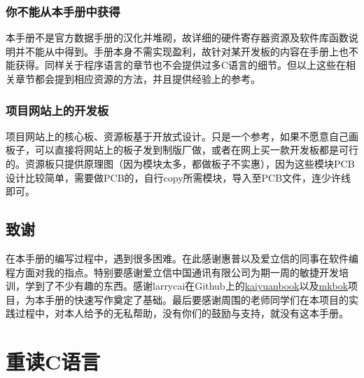 \documentclass[a4paper]{book}
\makeatletter
\let\savedtitle=\@title
\renewcommand{\headrulewidth}{0pt}
\newcounter{tab}[chapter]
\newcommand{\chap}[1]{\newpage\thispagestyle{empty}\chapter{#1}\label{chap:\thechapter}}
\makeatother
\begin{document}
\subsection*{你不能从本手册中获得}

本手册不是官方数据手册的汉化并堆砌，故详细的硬件寄存器资源及软件库函数说明并不能从中得到。手册本身不需实现盈利，故针对某开发板的内容在手册上也不能获得。同样关于程序语言的章节也不会提供过多C语言的细节。但以上这些在相关章节都会提到相应资源的方法，并且提供经验上的参考。

\subsection*{项目网站上的开发板}

项目网站上的核心板、资源板基于开放式设计。只是一个参考，如果不愿意自己画板子，可以直接将网站上的板子发到制版厂做，或者在网上买一款开发板都是可行的。资源板只提供原理图（因为模块太多，都做板子不实惠），因为这些模块PCB设计比较简单，需要做PCB的，自行copy所需模块，导入至PCB文件，连少许线即可。

\section*{致谢}

在本手册的编写过程中，遇到很多困难。在此感谢惠普以及爱立信的同事在软件编程方面对我的指点。特别要感谢爱立信中国通讯有限公司为期一周的敏捷开发培训，学到了不少有趣的东西。感谢larrycai在Github上的\href{www.github.com/larrycai/kaiyuanbook}{kaiyuanbook}以及\href{www.github.com/larrycai/mkbok}{mkbok}项目，为本手册的快速写作奠定了基础。最后要感谢周围的老师同学们在本项目的实践过程中，对本人给予的无私帮助，没有你们的鼓励与支持，就没有这本手册。

\tableofcontents\newpage\thispagestyle{empty}


\fancyhf{}
\fancyhead[LE]{\color{colorheader}\quad\small\textbf\thepage\quad\quad\small\leftmark}
\fancyhead[RO]{\color{colorheader}\small\rightmark\quad\quad\small\textbf\thepage\quad}

\pagestyle{fancy}

\mainmatter
\chap{重读C语言}
\end{document}
